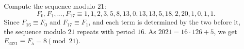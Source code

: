 Compute the sequence modulo $21$:
\[F_0,F_1,\dots,F_{17}\equiv1,1,2,3,5,8,13,0,13,13,5,18,2,20,1,0,1,1.\]
Since $F_{16}\equiv F_0$ and $F_{17}\equiv F_1$, and each term is determined by the two before it, the sequence modulo $21$ repeats with period $16$. As $2021=16\cdot126+5$, we get $F_{2021}\equiv F_5=\boxed{8}\pmod{21}$.
